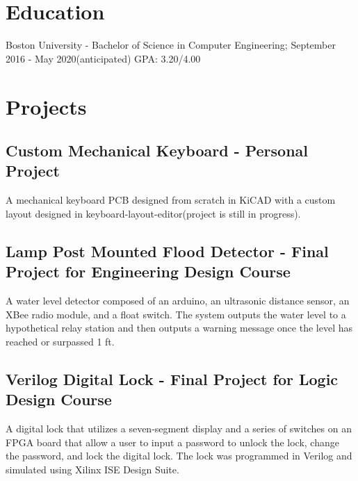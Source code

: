 \documentclass{article}
\begin{document}
\section{Education}
Boston University - Bachelor of Science in Computer Engineering; September 2016 - May 2020(anticipated)
GPA: 3.20/4.00

\section{Projects}
\subsection{Custom Mechanical Keyboard - Personal Project}
A mechanical keyboard PCB designed from scratch in KiCAD with a custom layout designed in keyboard-layout-editor(project is still in progress).
\subsection{Lamp Post Mounted Flood Detector - Final Project for Engineering Design Course}
A water level detector composed of an arduino, an ultrasonic distance sensor, an XBee radio module, and a float switch. The system outputs the water level to a hypothetical relay station and then outputs a warning message once the level has reached or surpassed 1 ft.
\subsection{Verilog Digital Lock - Final Project for Logic Design Course}
A digital lock that utilizes a seven-segment display and a series of switches on an FPGA board that allow a user to input a password to unlock the lock, change the password, and lock the digital lock. The lock was programmed in Verilog and simulated using Xilinx ISE Design Suite.
\end{document}
